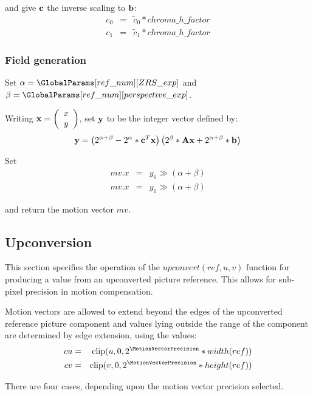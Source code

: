 and give ${\bf c}$ the inverse scaling to ${\bf b}$:
\begin{eqnarray*}
c_0 & = & \tilde{c}_0*chroma\_h\_factor \\
c_1 & = & \tilde{c}_1*chroma\_h\_factor
\end{eqnarray*}

\subsubsection{Field generation}

Set $\alpha = \GlobalParams[ref\_num][ZRS\_exp]$ and 
$\beta =\GlobalParams[ref\_num][perspective\_exp]$.

Writing ${\bf x}=\left( \begin{array}{c} x\\y \end{array}\right)$, set ${\bf y}$ to be
the integer vector defined by:
\begin{equation*}
{\bf y}=\left(2^{\alpha+\beta}-2^\alpha * {\bf c}^T {\bf x}\right)\left(2^\beta*{\bf Ax}+2^{\alpha+\beta}*{\bf b}\right)
\end{equation*}

Set
\begin{eqnarray*}
mv.x & = & y_0\gg (\alpha+\beta) \\
mv.x & = & y_1\gg (\alpha+\beta)
\end{eqnarray*}

and return the motion vector $mv$.

\subsection{Upconversion}
\label{upconvert}

This section specifies the operation of the $upconvert(ref, u, v)$ function
for producing a value from an upconverted picture reference. This
allows for sub-pixel precision in motion compensation.

Motion vectors are allowed to extend beyond the edges of the 
upconverted reference picture component and values lying outside the range
of the component are determined by edge extension, using the values:
\begin{eqnarray*}
cu & = &\clip(u, 0, 2^\MotionVectorPrecision*width(ref)) \\
cv & = &\clip(v, 0, 2^\MotionVectorPrecision*height(ref))
\end{eqnarray*}

There are four cases, depending upon the motion vector precision selected.

